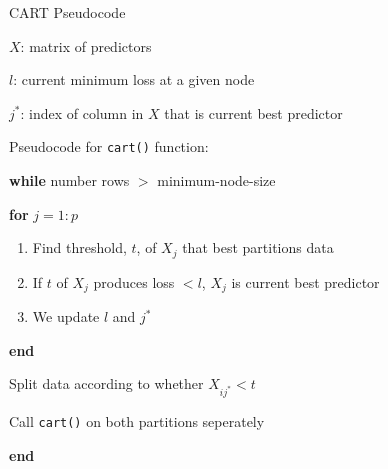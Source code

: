 \documentclass[pdf]{beamer}
\begin{document}
				
		\begin{frame}{CART Pseudocode}
		\begin{enumerate}[]
			{\selectfont
						
			\item $X$: matrix of predictors
			\item $l$: current minimum loss at a given node
			\item $j^*$: index of column in $X$ that is current best predictor  
			
			\vspace{5 mm}			
			\item Pseudocode for \texttt{cart()} function:  
			\vspace{3 mm}

			\item{\textbf{while} number rows $>$ minimum-node-size}
				\item \hspace{3 mm} \textbf{for} $j = 1:p$
					\begin{enumerate}[  ]
						\item \hspace{6 mm} Find threshold, $t$, of $X_j$ that best partitions data
						\item \hspace{6 mm} If $t$ of $X_j$ produces loss $< l$, $X_j$ is current best predictor
						\item \hspace{6 mm} We update $l$ and $j^*$
					\end{enumerate}
				\item \hspace{3 mm} \textbf{end}
				\item \hspace{3 mm} Split data according to whether $X_{ij^*} < t$
				\item \hspace{3 mm} Call \texttt{cart()} on both partitions seperately
			\item \textbf{end}
			}
		\end{enumerate}
		\end{frame}
		
\end{document}
